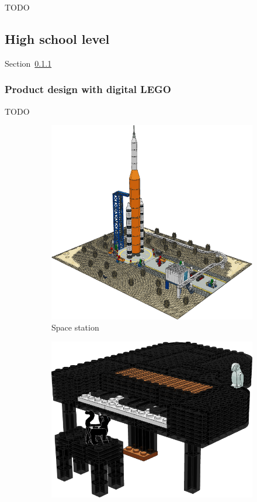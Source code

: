 \documentclass{PDS}
\begin{document}
TODO

\subsection{High school level}
\label{sec:school}

Section~\ref{sec:school-lego}

\subsubsection{Product design with digital LEGO}
\label{sec:school-lego}

TODO

\begin{figure}[htbp]
    \begin{subfigure}[b]{0.3\textwidth}
        \includegraphics[width=\textwidth]{./figures/space.png}
        \caption{Space station}
        \label{fig:rocket}
    \end{subfigure}
    \hfill
    \begin{subfigure}[b]{0.3\textwidth}
        \includegraphics[width=\textwidth]{./figures/piano.png}

\end{subfigure}
\end{figure}
\end{document}
